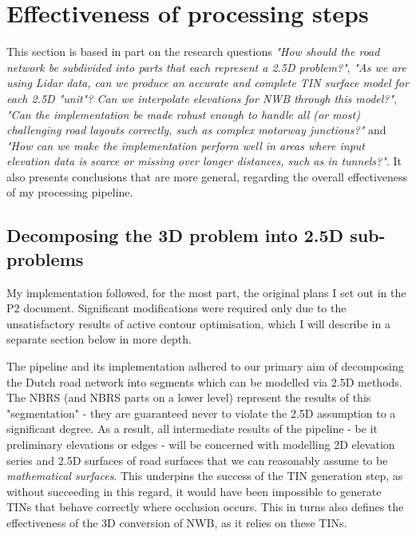 \section{Effectiveness of processing steps}
\label{sec:effectiveness}

This section is based in part on the research questions \textit{"How should the road network be subdivided into parts that each represent a 2.5D problem?"}, \textit{"As we are using Lidar data, can we produce an accurate and complete TIN surface model for each 2.5D "unit"? Can we interpolate elevations for NWB through this model?"}, \textit{"Can the implementation be made robust enough to handle all (or \textit{most}) challenging road layouts correctly, such as complex motorway junctions?"} and \textit{"How can we make the implementation perform well in areas where input elevation data is scarce or missing over longer distances, such as in tunnels?"}. It also presents conclusions that are more general, regarding the overall effectiveness of my processing pipeline.

\subsection{Decomposing the 3D problem into 2.5D sub-problems}
\label{sub:effectivenessdecomposition}

My implementation followed, for the most part, the original plans I set out in the P2 document. Significant modifications were required only due to the unsatisfactory results of active contour optimisation, which I will describe in a separate section below in more depth.

The pipeline and its implementation adhered to our primary aim of decomposing the Dutch road network into segments which can be modelled via 2.5D methods. The NBRS (and NBRS parts on a lower level) represent the results of this "segmentation" - they are guaranteed never to violate the 2.5D assumption to a significant degree. As a result, all intermediate results of the pipeline - be it preliminary elevations or edges - will be concerned with modelling 2D elevation series and 2.5D surfaces of road surfaces that we can reasonably assume to be \textit{mathematical surfaces}. This underpins the success of the TIN generation step, as without succeeding in this regard, it would have been impossible to generate TINs that behave correctly where occlusion occurs. This in turns also defines the effectiveness of the 3D conversion of NWB, as it relies on these TINs.

